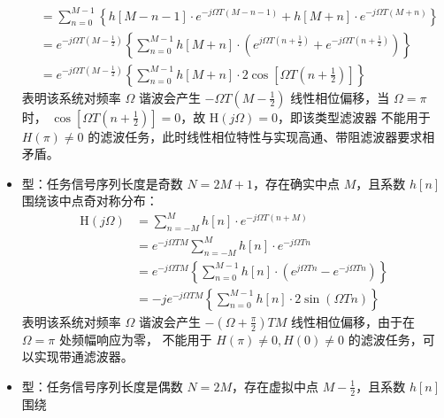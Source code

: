 \begin{itemize}
\begin{align*}
                                   & =\sum_{n=0}^{M-1}
              \left\{
              h[M-n-1] \cdot e^{-j \Omega T(M-n-1)}+ h[M+n] \cdot e^{-j \Omega T(M+n)}
              \right\}                                                                  \\
                                   & =e^{-j \Omega T (M-\frac{1}{2})}
              \left\{
              \sum_{n=0}^{M-1} h[M+n] \cdot\left(e^{j \Omega T(n+\frac{1}{2})}+e^{-j \Omega T(n+\frac{1}{2})}\right)
              \right\}                                                                  \\
                                   & =e^{-j \Omega T (M-\frac{1}{2})}
              \left\{
              \sum_{n=0}^{M-1} h[M+n] \cdot 2 \cos \left[\Omega T (n+\frac{1}{2})\right]
              \right\}
          \end{align*}
          表明该系统对频率 $\Omega$ 谐波会产生 $-\Omega T(M-\frac{1}{2})$ 线性相位偏移，当 $\Omega=\pi$ 时，
          $\cos \left[\Omega T (n+\frac{1}{2})\right]=0$，故 $\mathrm{H}(j\Omega)=0$，即该类型滤波器
          不能用于$H(\pi)\ne 0$ 的滤波任务，此时线性相位特性与实现高通、带阻滤波器要求相矛盾。
    \item \uppercase\expandafter{} 型：任务信号序列长度是奇数 $N=2M+1$，存在确实中点 $M$，且系数 $h[n]$ 围绕该中点奇对称分布：
          \begin{align*}
              \mathrm{H}(j \Omega) & =\sum_{n=-M}^{M} h[n] \cdot e^{-j \Omega T(n+M)}                                   \\
                                   & =e^{-j \Omega T M} \sum_{n=-M}^{M} h[n] \cdot e^{-j \Omega Tn}                     \\
                                   & =e^{-j \Omega T M}
              \left\{
              \sum_{n=0}^{M-1} h[n] \cdot\left(e^{j \Omega T n}-e^{-j \Omega T n}\right)
              \right\}                                                                                                  \\
                                   & =-je^{-j \Omega T M}\left\{\sum_{n=0}^{M-1} h[n] \cdot 2 \sin (\Omega T n)\right\}
          \end{align*}
          表明该系统对频率 $\Omega$ 谐波会产生 $-(\Omega+\frac{\pi}{2}) TM$ 线性相位偏移，由于在 $\Omega=\pi$ 处频幅响应为零，
          不能用于 $H(\pi)\ne 0, H(0)\ne 0$ 的滤波任务，可以实现带通滤波器。
    \item \uppercase\expandafter{} 型：任务信号序列长度是偶数 $N=2M$，存在虚拟中点 $M-\frac{1}{2}$，且系数 $h[n]$ 围绕

\end{itemize}
